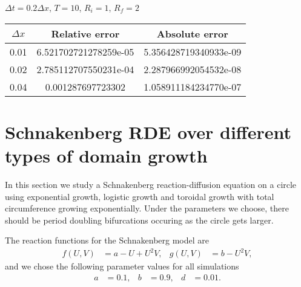 \documentclass[fleqn,12pt]{siamart1116}
\begin{document}
$\Delta t = 0.2 \Delta x$, $T = 10$, $R_i = 1$, $R_f = 2$
\begin{center}
\begin{tabular}{ |c||c|c| } 
 \hline
 $\Delta x$ & Relative error & Absolute error \\ 
 \hline
 \hline
 0.01 & 6.521702721278259e-05 & 5.356428719340933e-09 \\ 
 \hline 
 0.02 & 2.785112707550231e-04 & 2.287966992054532e-08 \\ 
 \hline
 0.04 & 0.001287697723302 & 1.058911184234770e-07 \\ 
 \hline
 \end{tabular}
\end{center}
\medskip

\section{Schnakenberg RDE over different types of domain growth}

In this section we study a Schnakenberg reaction-diffusion equation on a circle using exponential growth, logistic growth and toroidal growth with total circumference growing exponentially. Under the parameters we choose, there should be period doubling bifurcations occuring as the circle gets larger.

The reaction functions for the Schnakenberg model are
\begin{align}
f(U,V) &= a - U + U^2V, & g(U,V) &= b - U^2V,
\end{align}
and we chose the following parameter values for all simulations
\begin{align}
a &= 0.1, & b &= 0.9, & d &= 0.01.
\end{align}
\end{document}
